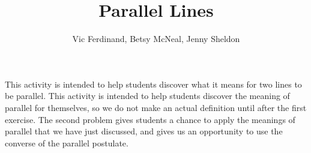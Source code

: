 \documentclass{ximera}
\title{Parallel Lines}
\author{Vic Ferdinand, Betsy McNeal, Jenny Sheldon}
\begin{document}
\begin{abstract}\end{abstract}
\maketitle

\begin{instructorIntro}
This activity is intended to help students discover what it means for two lines to be parallel.  This activity is intended to help students discover the meaning of parallel for themselves, so we do not make an actual definition until after the first exercise.  The second problem gives students a chance to apply the meanings of parallel that we have just discussed, and gives us an opportunity to use the converse of the parallel postulate.


\end{instructorIntro}
\end{document}
